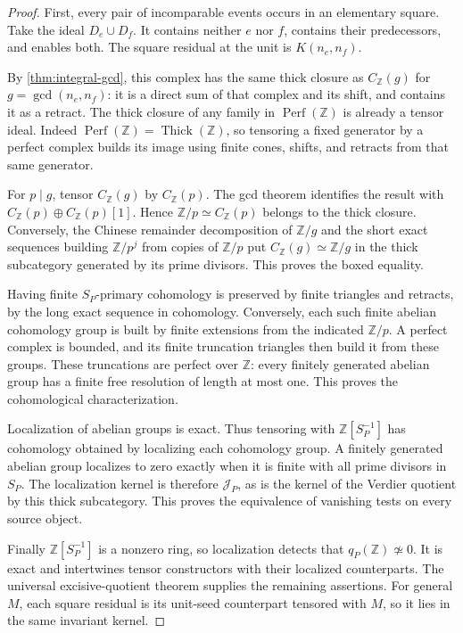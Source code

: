 \documentclass[11pt]{article}
\theoremstyle{definition}
\theoremstyle{remark}
\begin{document}
\begin{proof}
First, every pair of incomparable events occurs in an elementary square. Take the ideal $D_e\cup D_f$. It contains neither $e$ nor $f$, contains their predecessors, and enables both. The square residual at the unit is $K(n_e,n_f)$.

By \cref{thm:integral-gcd}, this complex has the same thick closure as $C_{\mathbb Z}(g)$ for $g=\gcd(n_e,n_f)$: it is a direct sum of that complex and its shift, and contains it as a retract. The thick closure of any family in $\operatorname{Perf}(\mathbb Z)$ is already a tensor ideal. Indeed $\operatorname{Perf}(\mathbb Z)=\operatorname{Thick}(\mathbb Z)$, so tensoring a fixed generator by a perfect complex builds its image using finite cones, shifts, and retracts from that same generator.

For $p\mid g$, tensor $C_{\mathbb Z}(g)$ by $C_{\mathbb Z}(p)$. The gcd theorem identifies the result with $C_{\mathbb Z}(p)\oplus C_{\mathbb Z}(p)[1]$. Hence $\mathbb Z/p\simeq C_{\mathbb Z}(p)$ belongs to the thick closure. Conversely, the Chinese remainder decomposition of $\mathbb Z/g$ and the short exact sequences building $\mathbb Z/p^j$ from copies of $\mathbb Z/p$ put $C_{\mathbb Z}(g)\simeq\mathbb Z/g$ in the thick subcategory generated by its prime divisors. This proves the boxed equality.

Having finite $S_P$-primary cohomology is preserved by finite triangles and retracts, by the long exact sequence in cohomology. Conversely, each such finite abelian cohomology group is built by finite extensions from the indicated $\mathbb Z/p$. A perfect complex is bounded, and its finite truncation triangles then build it from these groups. These truncations are perfect over $\mathbb Z$: every finitely generated abelian group has a finite free resolution of length at most one. This proves the cohomological characterization.

Localization of abelian groups is exact. Thus tensoring with $\mathbb Z[S_P^{-1}]$ has cohomology obtained by localizing each cohomology group. A finitely generated abelian group localizes to zero exactly when it is finite with all prime divisors in $S_P$. The localization kernel is therefore $\mathcal J_P$, as is the kernel of the Verdier quotient by this thick subcategory. This proves the equivalence of vanishing tests on every source object.

Finally $\mathbb Z[S_P^{-1}]$ is a nonzero ring, so localization detects that $q_P(\mathbb Z)\not\simeq0$. It is exact and intertwines tensor constructors with their localized counterparts. The universal excisive-quotient theorem supplies the remaining assertions. For general $M$, each square residual is its unit-seed counterpart tensored with $M$, so it lies in the same invariant kernel.
\end{proof}
\end{document}
